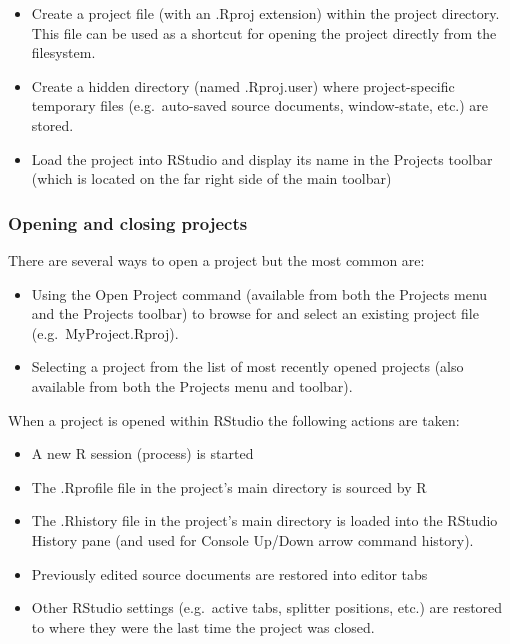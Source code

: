 \documentclass[
]{book}
\providecommand{\tightlist}{%
  \setlength{\itemsep}{0pt}\setlength{\parskip}{0pt}}
\begin{document}
\begin{itemize}
\tightlist
\item
  Create a project file (with an .Rproj extension) within the project
  directory. This file can be used as a shortcut for opening the project
  directly from the filesystem.
\item
  Create a hidden directory (named .Rproj.user) where project-specific
  temporary files (e.g.~auto-saved source documents, window-state, etc.)
  are stored.
\item
  Load the project into RStudio and display its name in the Projects
  toolbar (which is located on the far right side of the main toolbar)
\end{itemize}

\hypertarget{openproj}{%
\subsubsection{Opening and closing projects}\label{openproj}}

There are several ways to open a project but the most common are:

\begin{itemize}
\tightlist
\item
  Using the Open Project command (available from both the Projects menu
  and the Projects toolbar) to browse for and select an existing project
  file (e.g.~MyProject.Rproj).
\item
  Selecting a project from the list of most recently opened projects
  (also available from both the Projects menu and toolbar).
\end{itemize}

When a project is opened within RStudio the following actions are taken:

\begin{itemize}
\tightlist
\item
  A new R session (process) is started
\item
  The .Rprofile file in the project's main directory is sourced by R
\item
  The .Rhistory file in the project's main directory is loaded into the
  RStudio History pane (and used for Console Up/Down arrow command
  history).
\item
  Previously edited source documents are restored into editor tabs
\item
  Other RStudio settings (e.g.~active tabs, splitter positions, etc.)
  are restored to where they were the last time the project was closed.
\end{itemize}
\end{document}
